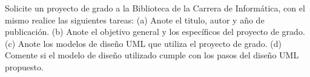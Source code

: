 Solicite un proyecto de grado a la Biblioteca de la Carrera de Informática, con el mismo realice las siguientes tareas: (a) Anote el titulo, autor y año de publicación. (b) Anote el objetivo general y los específicos del proyecto de grado. (c) Anote los modelos de diseño UML que utiliza el proyecto de grado. (d) Comente si el modelo de diseño utilizado cumple con los pasos del diseño UML propuesto.

